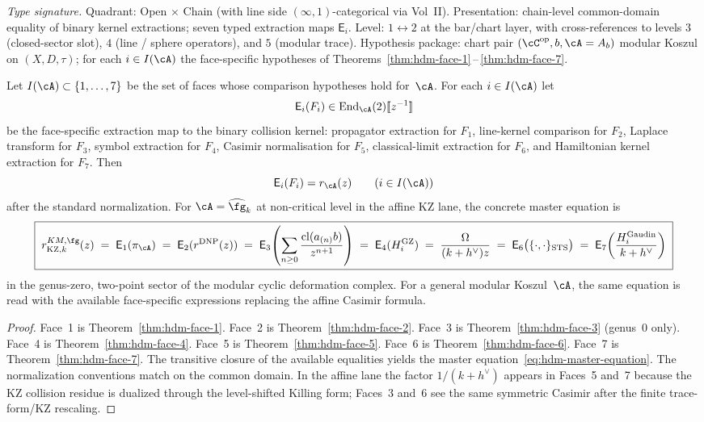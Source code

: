 \begin{theorem}
\label{thm:hdm-seven-way-master}
\emph{Type signature.} Quadrant: Open $\times$ Chain (with line
side $(\infty,1)$-categorical via Vol~II). Presentation: chain-level
common-domain equality of binary kernel extractions; seven typed
extraction maps $\mathsf E_i$. Level: $1\leftrightarrow 2$ at the
bar/chart layer, with cross-references to levels $3$ (closed-sector
slot), $4$ (line / sphere operators), and $5$ (modular trace).
Hypothesis package: chart pair $(\cC^{\mathrm{op}}, b, \cA = A_b)$
modular Koszul on $(X,D,\tau)$; for each $i\in I(\cA)$ the
face-specific hypotheses of Theorems~\ref{thm:hdm-face-1}\,--\,\ref{thm:hdm-face-7}.

Let $I(\cA)\subset\{1,\ldots,7\}$ be the set of faces whose comparison
hypotheses hold for~$\cA$. For each $i\in I(\cA)$ let
\[
\mathsf E_i(F_i)\in \mathrm{End}_\cA(2)[\![z^{-1}]\!]
\]
be the face-specific extraction map to the binary collision kernel:
propagator extraction for $F_1$, line-kernel comparison for $F_2$,
Laplace transform for $F_3$, symbol extraction for $F_4$, Casimir
normalisation for $F_5$, classical-limit extraction for $F_6$, and
Hamiltonian kernel extraction for $F_7$. Then
\[
\mathsf E_i(F_i)=r_\cA(z)
\qquad (i\in I(\cA))
\]
after the standard normalization.
For $\cA=\widehat{\fg}_k$ at non-critical level in the affine KZ lane,
the concrete master equation is
\begin{equation}\label{eq:hdm-master-equation}
\boxed{\;
r^{KM,\fg}_{\mathrm{KZ},k}(z)
\;=\;
\mathsf E_1(\pi_\cA)
\;=\;
\mathsf E_2(r^{\mathrm{DNP}}(z))
\;=\;
\mathsf E_3\!\left(\sum_{n \geq 0}
\frac{\mathrm{cl}(a_{(n)}b)}{z^{n+1}}\right)
\;=\;
\mathsf E_4(H_i^{\mathrm{GZ}})
\;=\;
\frac{\Omega}{(k+h^\vee)z}
\;=\;
\mathsf E_6\bigl(\{\cdot,\cdot\}_{\mathrm{STS}}\bigr)
\;=\;
\mathsf E_7\!\left(\frac{H_i^{\mathrm{Gaudin}}}{k + h^\vee}\right)\;}
\end{equation}
in the genus-zero, two-point sector of the modular cyclic deformation
complex. For a general modular Koszul~$\cA$, the same equation is read
with the available face-specific expressions replacing the affine
Casimir formula.
\end{theorem}

\begin{proof}
Face~1 is Theorem~\ref{thm:hdm-face-1}. Face~2 is
Theorem~\ref{thm:hdm-face-2}. Face~3 is Theorem~\ref{thm:hdm-face-3} (genus~$0$ only).
Face~4 is Theorem~\ref{thm:hdm-face-4}. Face~5 is
Theorem~\ref{thm:hdm-face-5}. Face~6 is Theorem~\ref{thm:hdm-face-6}.
Face~7 is Theorem~\ref{thm:hdm-face-7}. The transitive closure of
the available equalities yields the master
equation~\eqref{eq:hdm-master-equation}.
The normalization conventions match on the common domain. In the
affine lane the factor $1/(k+h^\vee)$ appears in Faces~5 and~7
because the KZ collision residue is dualized through the
level-shifted Killing form; Faces~3 and~6 see the same symmetric
Casimir after the finite trace-form/KZ rescaling.
\end{proof}


